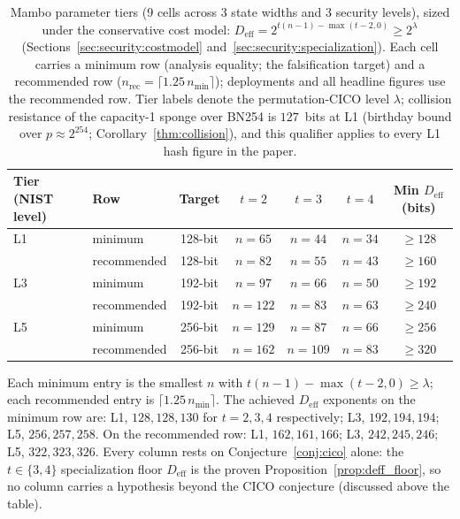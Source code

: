 \documentclass[11pt,a4paper]{article}
\theoremstyle{definition}
\begin{document}
\begin{table}[h]
\centering
\caption{Mambo parameter tiers (9 cells across 3 state widths and 3
security levels), sized under the conservative cost model:
$D_{\mathrm{eff}} = 2^{t(n-1)-\max(t-2,0)} \ge
2^{\lambda}$ (Sections~\ref{sec:security:costmodel}
and~\ref{sec:security:specialization}). Each cell carries a minimum
row (analysis equality; the falsification target) and a recommended
row ($n_{\mathrm{rec}} = \lceil 1.25\, n_{\min} \rceil$); deployments
and all headline figures use the recommended row. Tier labels denote
the permutation-CICO level $\lambda$; collision resistance of the
capacity-1 sponge over BN254 is $127$~bits at L1 (birthday bound
over $p \approx 2^{254}$; Corollary~\ref{thm:collision}), and this
qualifier applies to every L1 hash figure in the paper.}
\label{tab:tiers}
\begin{tabular}{@{}llccccc@{}}
\toprule
Tier (NIST level) & Row & Target & $t=2$ & $t=3$ & $t=4$ & Min $D_{\mathrm{eff}}$ (bits) \\
\midrule
L1 & minimum     & 128-bit & $n{=}65$  & $n{=}44$  & $n{=}34$ & $\ge 128$ \\
   & recommended & 128-bit & $n{=}82$  & $n{=}55$  & $n{=}43$ & $\ge 160$ \\
\midrule
L3 & minimum     & 192-bit & $n{=}97$  & $n{=}66$  & $n{=}50$ & $\ge 192$ \\
   & recommended & 192-bit & $n{=}122$ & $n{=}83$  & $n{=}63$ & $\ge 240$ \\
\midrule
L5 & minimum     & 256-bit & $n{=}129$ & $n{=}87$  & $n{=}66$ & $\ge 256$ \\
   & recommended & 256-bit & $n{=}162$ & $n{=}109$ & $n{=}83$ & $\ge 320$ \\
\bottomrule
\end{tabular}
\smallskip

\footnotesize
Each minimum entry is the smallest $n$ with $t(n-1) - \max(t-2,0) \ge
\lambda$; each recommended entry is $\lceil 1.25\, n_{\min} \rceil$.
The achieved $D_{\mathrm{eff}}$ exponents on the minimum row are: L1,
$128, 128, 130$ for $t = 2, 3, 4$ respectively; L3, $192, 194, 194$;
L5, $256, 257, 258$. On the recommended row: L1, $162, 161, 166$;
L3, $242, 245, 246$; L5, $322, 323, 326$. Every column rests on
Conjecture~\ref{conj:cico} alone: the $t \in \{3,4\}$ specialization
floor $D_{\mathrm{eff}}$ is the proven
Proposition~\ref{prop:deff_floor}, so no column carries a hypothesis
beyond the CICO conjecture (discussed above the table).
\end{table}
\end{document}
